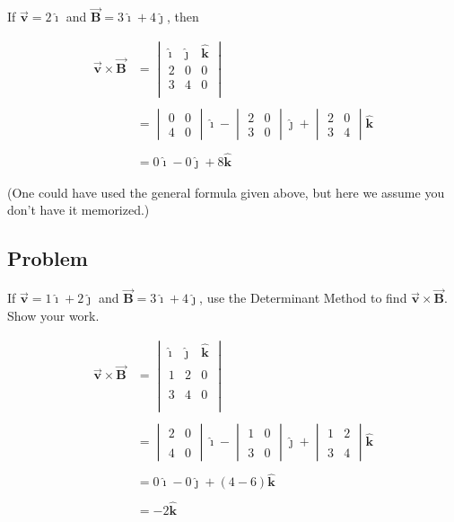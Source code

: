 \documentclass{article}
\newcommand{\ihat}[0]{\hat{\boldsymbol{\imath}}}
\newcommand{\jhat}[0]{\hat{\boldsymbol{\jmath}}}
\newcommand{\khat}[0]{\hat{\boldsymbol{k}}}
\newcommand{\bfvec}[1]{\vec{\mathbf{#1}}}
\begin{document}
If $\bfvec{v}=2\ihat$ and $\bfvec{B}=3\ihat+4\jhat$, then

$$
\begin{align*}
\bfvec{v}\times\bfvec{B}
&=
\begin{vmatrix}
\ihat&\jhat&\khat\\
2&0&0\\
3&4&0\\
\end{vmatrix}
\\\\ &=
\begin{vmatrix}
0 & 0 \\
4 & 0 
\end{vmatrix} \ihat - \begin{vmatrix}
2 & 0 \\
3 & 0 
\end{vmatrix} \jhat +  \begin{vmatrix}
2 & 0 \\
3 & 4 
\end{vmatrix} \khat
\\\\ &=
0\ihat - 0\jhat + 8\khat
\end{align*}
$$

(One could have used the general formula given above, but here we assume you don't have it memorized.)

\subsection{Problem}

If $\bfvec{v}=1\ihat+2\jhat$ and $\bfvec{B}=3\ihat+4\jhat$, use the Determinant Method to find $\bfvec{v}\times\bfvec{B}$. Show your work.

\ifsolutions
$$
\begin{align*}
\bfvec{v}\times\bfvec{B}
&=
\begin{vmatrix}
\ihat&\jhat&\khat\\\\
1&2&0\\\\
3&4&0\\\\
\end{vmatrix}
\\\\ &=
\begin{vmatrix}
2 & 0 \\\\
4 & 0 
\end{vmatrix} \ihat - \begin{vmatrix}
1 & 0 \\\\
3 & 0 
\end{vmatrix} \jhat +  \begin{vmatrix}
1 & 2 \\\\
3 & 4 
\end{vmatrix} \khat
\\\\ &=
0\ihat - 0\jhat + (4-6)\khat
\\\\ &=
-2\khat
\end{align*}
$$
\fi
\end{document}
